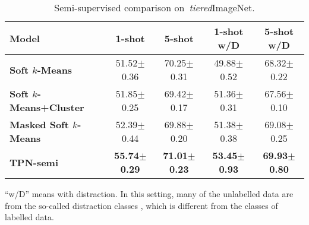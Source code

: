 \documentclass{article} \usepackage{iclr2019_conference,times}
\def\tiered{{\textit{tiered}ImageNet}}
\begin{document}
\begin{table}[ht]
\centering
\begin{threeparttable}
\small
\caption{Semi-supervised comparison on~\tiered.}
\label{semi-tiered-std}
\begin{tabular}{lcccc}
\hline
Model                            						 & \multicolumn{1}{c}{1-shot} & \multicolumn{1}{c}{5-shot} & \multicolumn{1}{c}{1-shot w/D} & \multicolumn{1}{c}{5-shot w/D} \\ \hline
\textbf{Soft $k$-Means}          & 51.52$\pm$0.36 & 70.25$\pm$0.31 & 49.88$\pm$0.52 & 68.32$\pm$0.22\\
\textbf{Soft $k$-Means+Cluster}  & 51.85$\pm$0.25 & 69.42$\pm$0.17 & 51.36$\pm$0.31 & 67.56$\pm$0.10\\
\textbf{Masked Soft $k$-Means}   & 52.39$\pm$0.44 & 69.88$\pm$0.20 & 51.38$\pm$0.38 & 69.08$\pm$0.25\\ \hline
\textbf{TPN-semi}                & \textbf{55.74$\pm$0.29} & \textbf{71.01$\pm$0.23} & \textbf{53.45$\pm$0.93} & \textbf{69.93$\pm$0.80}\\ \hline
\end{tabular}
\begin{tablenotes}
  	\item * ``w/D'' means with distraction. In this setting, many of the unlabelled data are from the so-called distraction classes , which is different from the classes of labelled data.
\end{tablenotes} 
\end{threeparttable}
\end{table}
\end{document}
